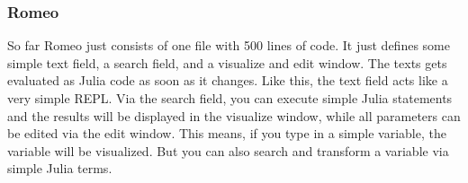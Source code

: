 \subsubsection{Romeo}
So far Romeo just consists of one file with 500 lines of code. It just defines some simple text field, a search field, and a visualize and edit window.
The texts gets evaluated as Julia code as soon as it changes. Like this, the text field acts like a very simple \ac{REPL}.
Via the search field, you can execute simple Julia statements and the results will be displayed in the visualize window, while all parameters can be edited via the edit window.
This means, if you type in a simple variable, the variable will be visualized. But you can also search and transform a variable via simple Julia terms.